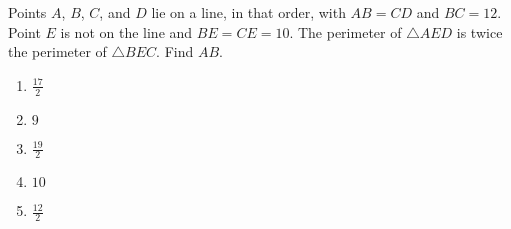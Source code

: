 Points $A$, $B$, $C$, and $D$ lie on a line, in that order, with $AB=CD$ and $BC=12$. Point $E$ is not on the line and $BE=CE=10$. The perimeter of $\triangle AED$ is twice the perimeter of $\triangle BEC$. Find $AB$. 

\begin{enumerate}
\item $\displaystyle\frac{17}{2}$
\item $9$
\item $\displaystyle\frac{19}{2}$
\item $10$
\item $\displaystyle\frac{12}{2}$
\end{enumerate}
